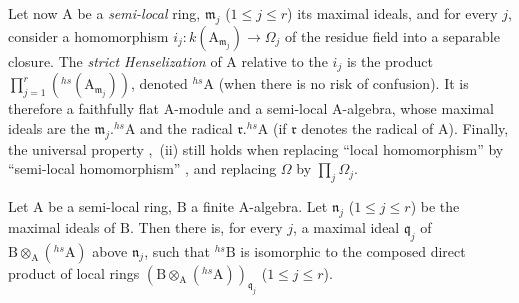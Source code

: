 \begin{env}[18.8.9]
\label{IV.18.8.9}
Let now A be a \emph{semi-local} ring, $\mathfrak{m}_j$ ($1\leq j\leq r$) its maximal ideals, and for every $j$, consider a homomorphism $i_j:k(\mathrm{A}_{\mathfrak{m}_j})\to\Omega_j$ of the residue field into a separable closure.
The \emph{strict Henselization} of A relative to the $i_j$ is the product $\prod_{j=1}^{r}({}^{hs}(\mathrm{A}_{\mathfrak{m}_j}))$, denoted ${}^{hs}\!\mathrm{A}$ (when there is no risk of confusion).
It is therefore a faithfully flat A-module and a semi-local A-algebra, whose maximal ideals are the $\mathfrak{m}_j.{}^{hs}\!\mathrm{A}$ and the radical $\mathfrak{r}.{}^{hs}\!\mathrm{A}$ (if $\mathfrak{r}$ denotes the radical of A).
Finally, the universal property ,~(ii) still holds when replacing ``local homomorphism'' by ``semi-local homomorphism'' , and replacing $\Omega$ by $\prod_j\Omega_j$.
\end{env}

\begin{proposition}[18.8.10]
\label{IV.18.8.10}
Let $\mathrm{A}$ be a semi-local ring, $\mathrm{B}$ a finite A-algebra.
Let $\mathfrak{n}_j$ ($1\leq j\leq r$) be the maximal ideals of $\mathrm{B}$.
Then there is, for every $j$, a maximal ideal $\mathfrak{q}_j$ of $\mathrm{B}\otimes_{\mathrm{A}}({}^{hs}\!\mathrm{A})$ above $\mathfrak{n}_j$, such that ${}^{hs}\!\mathrm{B}$ is isomorphic to the composed direct product of local rings $(\mathrm{B}\otimes_{\mathrm{A}}({}^{hs}\!\mathrm{A}))_{\mathfrak{q}_j}$ ($1\leq j\leq r$).
\end{proposition}

